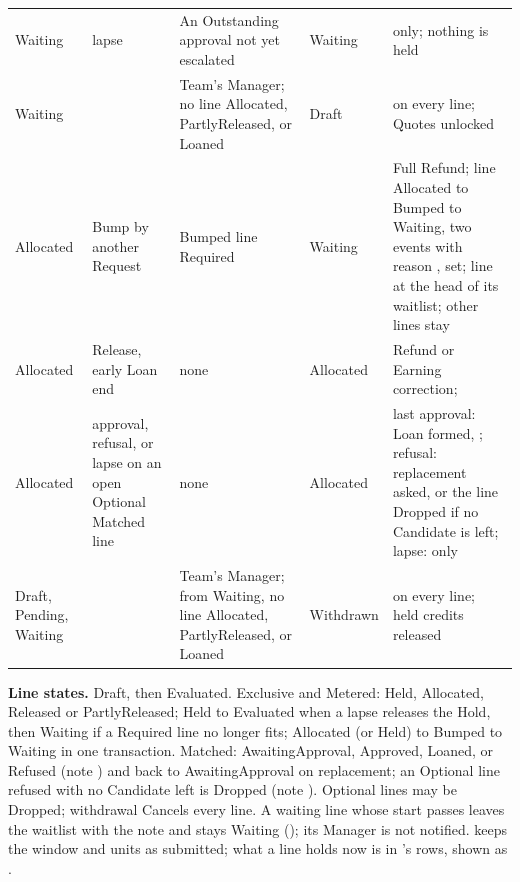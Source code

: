 {\begin{longtable}{@{}L{0.09\textwidth}L{0.18\textwidth}L{0.30\textwidth}L{0.09\textwidth}L{0.30\textwidth}@{}}
Waiting & lapse & An Outstanding approval not yet escalated & Waiting &  only; nothing is held \\
Waiting &  & Team's Manager; no line Allocated, PartlyReleased, or Loaned & Draft &  on every line; Quotes unlocked \\
Allocated & Bump by another Request & Bumped line Required & Waiting & Full Refund; line Allocated to Bumped to Waiting, two events with reason ,  set; line at the head of its waitlist; other lines stay \\
Allocated & Release, early Loan end & none & Allocated & Refund or Earning correction;  \\
Allocated & approval, refusal, or lapse on an open Optional Matched line & none & Allocated & last approval: Loan formed, ; refusal: replacement asked, or the line Dropped if no Candidate is left; lapse:  only \\
Draft, Pending, Waiting &  & Team's Manager; from Waiting, no line Allocated, PartlyReleased, or Loaned & Withdrawn &  on every line; held credits released \\
\end{longtable}}

\textbf{Line states.} Draft, then Evaluated. Exclusive and Metered: Held, Allocated, Released or PartlyReleased; Held to Evaluated when a lapse releases the Hold, then Waiting if a Required line no longer fits; Allocated (or Held) to Bumped to Waiting in one transaction. Matched: AwaitingApproval, Approved, Loaned, or Refused (note ) and back to AwaitingApproval on replacement; an Optional line refused with no Candidate left is Dropped (note ). Optional lines may be Dropped; withdrawal Cancels every line. A waiting line whose start passes leaves the waitlist with the note  and stays Waiting (); its Manager is not notified.  keeps the window and units as submitted; what a line holds now is in 's rows, shown as .

